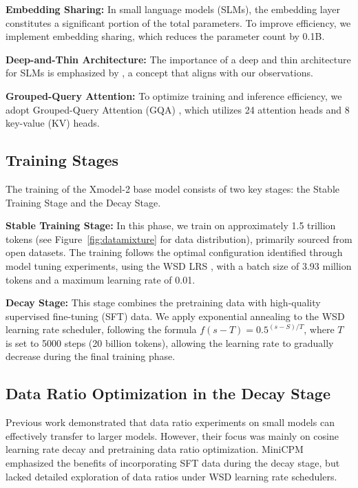 \documentclass{article}
\newcommand{\llm}{Xmodel-2\xspace}
\begin{document}
\noindent\textbf{Embedding Sharing:} In small language models (SLMs), the embedding layer constitutes a significant portion of the total parameters. To improve efficiency, we implement embedding sharing, which reduces the parameter count by 0.1B.

\noindent\textbf{Deep-and-Thin Architecture:} The importance of a deep and thin architecture for SLMs is emphasized by \citep{liu2024mobilellm}, a concept that aligns with our observations.

\noindent\textbf{Grouped-Query Attention:} To optimize training and inference efficiency, we adopt Grouped-Query Attention (GQA) \citep{ainslie2023gqa}, which utilizes 24 attention heads and 8 key-value (KV) heads.

\subsection{Training Stages}

The training of the \llm base model consists of two key stages: the Stable Training Stage and the Decay Stage.

\noindent\textbf{Stable Training Stage:} In this phase, we train on approximately 1.5 trillion tokens (see Figure~\ref{fig:datamixture} for data distribution), primarily sourced from open datasets. The training follows the optimal configuration identified through model tuning experiments, using the WSD LRS \citep{hu2024minicpm}, with a batch size of 3.93 million tokens and a maximum learning rate of 0.01.

\noindent\textbf{Decay Stage:} This stage combines the pretraining data with high-quality supervised fine-tuning (SFT) data. We apply exponential annealing to the WSD learning rate scheduler, following the formula $f(s-T) = 0.5^{(s-S)/T}$, where $T$ is set to 5000 steps (20 billion tokens), allowing the learning rate to gradually decrease during the final training phase.


\subsection{Data Ratio Optimization in the Decay Stage}
Previous work \citep{ye2024datamixinglawsoptimizing} demonstrated that data ratio experiments on small models can effectively transfer to larger models. However, their focus was mainly on cosine learning rate decay and pretraining data ratio optimization. MiniCPM \citep{hu2024minicpm} emphasized the benefits of incorporating SFT data during the decay stage, but lacked detailed exploration of data ratios under WSD learning rate schedulers.
\end{document}
